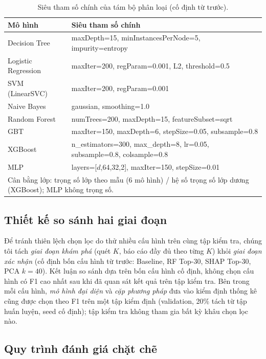 \documentclass[conference]{IEEEtran}
\begin{document}
\begin{table}[htbp]
  \caption{Siêu tham số chính của tám bộ phân loại (cố định từ trước).}
  \label{tab:hparams}
  \centering
  \small
  \begin{tabular}{ll}
    \toprule
    Mô hình & Siêu tham số chính \\
    \midrule
    Decision Tree & maxDepth=15, minInstancesPerNode=5, impurity=entropy \\
    Logistic Regression & maxIter=200, regParam=0.001, L2, threshold=0.5 \\
    SVM (LinearSVC) & maxIter=200, regParam=0.001 \\
    Naive Bayes & gaussian, smoothing=1.0 \\
    Random Forest & numTrees=200, maxDepth=15, featureSubset=sqrt \\
    GBT & maxIter=150, maxDepth=6, stepSize=0.05, subsample=0.8 \\
    XGBoost & n\_estimators=300, max\_depth=8, lr=0.05, subsample=0.8, colsample=0.8 \\
    MLP & layers=[$d$,64,32,2], maxIter=150, stepSize=0.01 \\
    \midrule
    \multicolumn{2}{l}{Cân bằng lớp: trọng số lớp theo mẫu (6 mô hình) / hệ số trọng số lớp dương (XGBoost); MLP không trọng số.} \\
    \bottomrule
  \end{tabular}
\end{table}

\subsection{Thiết kế so sánh hai giai đoạn}

Để tránh thiên lệch chọn lọc do thử nhiều cấu hình trên cùng tập kiểm tra, chúng tôi tách \emph{giai đoạn khám phá} (quét $K$, báo cáo đầy đủ theo từng $K$) khỏi \emph{giai đoạn xác nhận} (cố định bốn cấu hình từ trước: Baseline, RF Top-30, SHAP Top-30, PCA $k{=}40$). Kết luận so sánh dựa trên bốn cấu hình cố định, không chọn cấu hình có F1 cao nhất sau khi đã quan sát kết quả trên tập kiểm tra. Bên trong mỗi cấu hình, \emph{mô hình đại diện} và \emph{cặp phương pháp} đưa vào kiểm định thống kê cũng được chọn theo F1 trên một tập kiểm định (validation, 20\% tách từ tập huấn luyện, seed cố định); tập kiểm tra không tham gia bất kỳ khâu chọn lọc nào.

\subsection{Quy trình đánh giá chặt chẽ}
\label{sec:eval}
\end{document}
